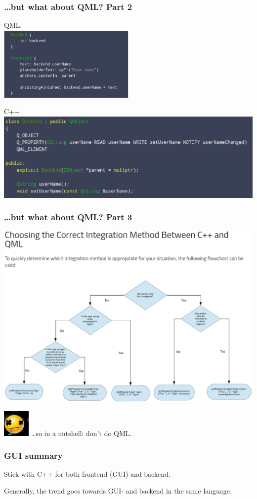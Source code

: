 \documentclass[xcolor=dvipsnames]{beamer}
\begin{document}
\begin{frame}[fragile]
\frametitle{\ldots but what about QML? Part 2}

QML:\\
\mbox{\includegraphics[width=0.5\textwidth]{qml_frontend.eps}}

C++\\
\mbox{\includegraphics[width=\textwidth]{qml_backend.eps}}


\end{frame}




\begin{frame}[fragile]
\frametitle{\ldots but what about QML? Part 3}

\mbox{\includegraphics[width=\textwidth]{qml_choose.eps}}

\mbox{\includegraphics[width=0.1\textwidth]{emoj-dead.eps}} \ldots so in a nutshell: don't do QML.

\end{frame}


\begin{frame}[fragile]
  \frametitle{GUI summary}

  Stick with C++ for both frontend (GUI) and backend.

  Generally, the trend goes towards GUI- and backend in the same language.
\end{frame}
\end{document}
